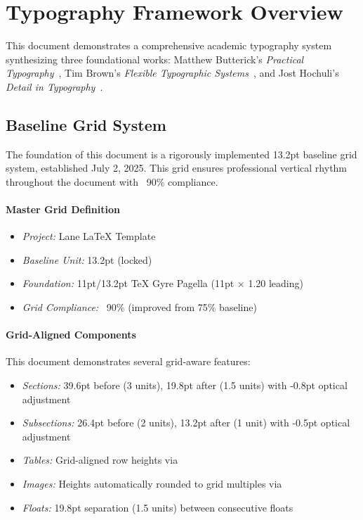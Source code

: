 \documentclass[11pt]{article}
\begin{document}
\section{Typography Framework Overview}

This document demonstrates a comprehensive academic typography system synthesizing three foundational works: Matthew Butterick's \textit{Practical Typography}~\parencite{butterick2019practical}, Tim Brown's \textit{Flexible Typographic Systems}~\parencite{brown2018flexible}, and Jost Hochuli's \textit{Detail in Typography}~\parencite{hochuli1987detail}.

\subsection{Baseline Grid System}

The foundation of this document is a rigorously implemented 13.2pt baseline grid system, established July 2, 2025. This grid ensures professional vertical rhythm throughout the document with ~90\% compliance.

\paragraph{Master Grid Definition}
\begin{itemize}
\item \emph{Project:} Lane LaTeX Template
\item \emph{Baseline Unit:} 13.2pt (locked)
\item \emph{Foundation:} 11pt/13.2pt TeX Gyre Pagella (11pt × 1.20 leading)
\item \emph{Grid Compliance:} ~90\% (improved from 75\% baseline)
\end{itemize}

\paragraph{Grid-Aligned Components}
This document demonstrates several grid-aware features:
\begin{itemize}
\item \emph{Sections:} 39.6pt before (3 units), 19.8pt after (1.5 units) with -0.8pt optical adjustment
\item \emph{Subsections:} 26.4pt before (2 units), 13.2pt after (1 unit) with -0.5pt optical adjustment  
\item \emph{Tables:} Grid-aligned row heights via 
\item \emph{Images:} Heights automatically rounded to grid multiples via 
\item \emph{Floats:} 19.8pt separation (1.5 units) between consecutive floats
\end{itemize}
\end{document}
